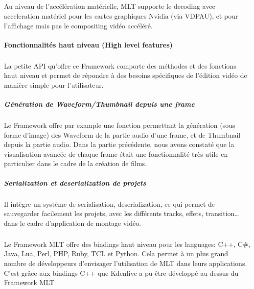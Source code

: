 \subparagraph{}

Au niveau de l'accélération matérielle, MLT supporte le
decoding avec acceleration matériel pour les cartes graphiques Nvidia
 (via VDPAU), et pour l'affichage
mais pas le compositing vidéo accéléré.


\paragraph{Fonctionnalités haut niveau (High level features)}

\subparagraph{}

La petite API qu'offre ce Framework comporte des méthodes et des
fonctions haut niveau et permet de répondre à des besoins spécifiques
de l'édition vidéo de manière simple pour l'utilisateur.

\subparagraph{Génération de Waveform/Thumbnail depuis une frame}

\subparagraph{}

Le Framework offre par example une fonction permettant la génération
(sous forme d'image) des Waveform de la partie audio d'une frame, et
de Thumbnail depuis la partie audio.  Dans la partie précédente, nous
avons constaté que la visualisation avancée de chaque frame était une
fonctionnalité très utile en particulier dans le cadre de la création
de films.

\subparagraph{Serialization et deserialization de projets}

\subparagraph{}

Il intègre un système de serialisation, deserialization, ce qui permet
de sauvegarder facilement les projets, avec les différents tracks,
effets, transition\ldots dans le cadre d'application de montage vidéo.

\subparagraph{}

Le Framework MLT offre des bindings haut niveau pour les
languages: C++, C\#, Java, Lua, Perl, PHP, Ruby, TCL et Python. Cela
permet à un plus grand nombre de développeurs d'envisager
l'utilisation de MLT dans leurs applications. C'est grâce
aux bindings C++ que Kdenlive a pu être développé au dessus du
Framework MLT


